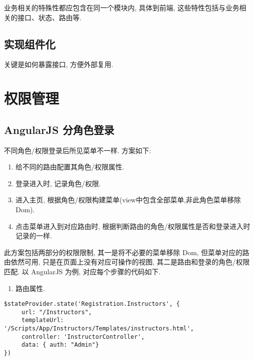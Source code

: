 业务相关的特殊性都应包含在同一个模块内, 具体到前端,
这些特性包括与业务相关的接口、状态、路由等.

\subsection{实现组件化}\label{ux5b9eux73b0ux7ec4ux4ef6ux5316}

关键是如何暴露接口, 方便外部复用.

\section{权限管理}\label{ux6743ux9650ux7ba1ux7406}

\subsection{AngularJS
分角色登录}\label{angularjs-ux5206ux89d2ux8272ux767bux5f55}

不同角色/权限登录后所见菜单不一样. 方案如下:

\begin{enumerate}
\def\labelenumi{\arabic{enumi}.}
\tightlist
\item
  给不同的路由配置其角色/权限属性.
\item
  登录进入时, 记录角色/权限.
\item
  进入主页, 根据角色/权限构建菜单(view中包含全部菜单,非此角色菜单移除
  Dom).
\item
  点击菜单进入到对应路由时,
  根据判断路由的角色/权限属性是否和登录进入时记录的一样.
\end{enumerate}

此方案包括两部分的权限限制, 其一是将不必要的菜单移除 Dom,
但菜单对应的路由依然可用, 只是在页面上没有对应可操作的视图,
其二是路由和登录的角色/权限匹配. 以 AngularJS 为例,
对应每个步骤的代码如下.

\begin{enumerate}
\def\labelenumi{\arabic{enumi}.}
\tightlist
\item
  路由属性.
\end{enumerate}

\begin{lstlisting}
$stateProvider.state('Registration.Instructors', {
     url: "/Instructors",
     templateUrl: '/Scripts/App/Instructors/Templates/instructors.html',
     controller: 'InstructorController',
     data: { auth: "Admin"}
})
\end{lstlisting}

